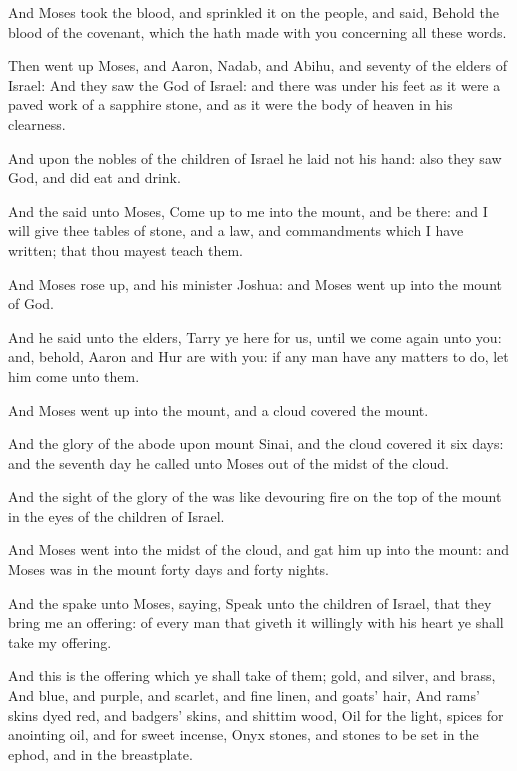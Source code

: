 \Verse And Moses took the blood, and sprinkled it on the people, and said, Behold the blood of the covenant, which the \LORD hath made with you concerning all these words.

\Verse Then went up Moses, and Aaron, Nadab, and Abihu, and seventy of the elders of Israel: \Verse And they saw the God of Israel: and there was under his feet as it were a paved work of a sapphire stone, and as it were the body of heaven in his clearness.

\Verse And upon the nobles of the children of Israel he laid not his hand: also they saw God, and did eat and drink.

\Verse And the \LORD said unto Moses, Come up to me into the mount, and be there: and I will give thee tables of stone, and a law, and commandments which I have written; that thou mayest teach them.

\Verse And Moses rose up, and his minister Joshua: and Moses went up into the mount of God.

\Verse And he said unto the elders, Tarry ye here for us, until we come again unto you: and, behold, Aaron and Hur are with you: if any man have any matters to do, let him come unto them.

\Verse And Moses went up into the mount, and a cloud covered the mount.

\Verse And the glory of the \LORD abode upon mount Sinai, and the cloud covered it six days: and the seventh day he called unto Moses out of the midst of the cloud.

\Verse And the sight of the glory of the \LORD was like devouring fire on the top of the mount in the eyes of the children of Israel.

\Verse And Moses went into the midst of the cloud, and gat him up into the mount: and Moses was in the mount forty days and forty nights.

\Chapter
\Verse And the \LORD spake unto Moses, saying, \Verse Speak unto the children of Israel, that they bring me an offering: of every man that giveth it willingly with his heart ye shall take my offering.

\Verse And this is the offering which ye shall take of them; gold, and silver, and brass, \Verse And blue, and purple, and scarlet, and fine linen, and goats' hair, \Verse And rams' skins dyed red, and badgers' skins, and shittim wood, \Verse Oil for the light, spices for anointing oil, and for sweet incense, \Verse Onyx stones, and stones to be set in the ephod, and in the breastplate.


